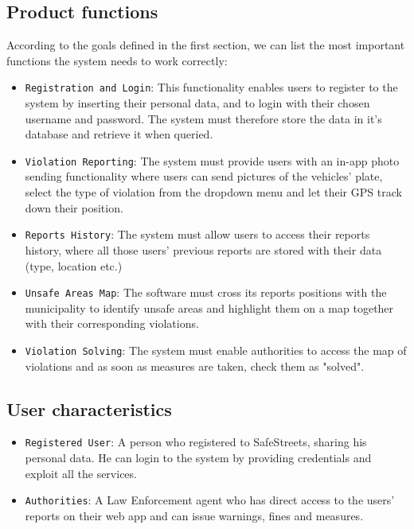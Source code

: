 \documentclass[12pt,a4paper]{article}
\begin{document}
\subsection{Product functions} 
According to the goals defined in the first section, we can list the most important functions the system needs to work correctly:
\begin{itemize}
\item {\texttt{Registration and Login}}: This functionality enables users to register to the system by inserting their personal data, and to login with their chosen username and password. The system must therefore store the data in it's database and retrieve it when queried.  
\item {\texttt{Violation Reporting}}: The system must provide users with an in-app photo sending functionality where users can send pictures of the vehicles' plate, select the type of violation from the dropdown menu and let their GPS track down their position.
\item {\texttt{Reports History}}: The system must allow users to access their reports history, where all those users' previous reports are stored with their data (type, location etc.)
\item {\texttt{Unsafe Areas Map}}: The software must cross its reports positions with the municipality to identify unsafe areas and highlight them on a map together with their corresponding violations.
\item {\texttt{Violation Solving}}: The system must enable authorities to access the map of violations and as soon as measures are taken, check them as "solved".
\end{itemize}

\newpage

\subsection{User characteristics} 
\begin{itemize}
\item {\texttt{Registered User}}: A person who registered to SafeStreets, sharing his personal data. He can login to the system by providing credentials and exploit all the services.
\item {\texttt{Authorities}}: A Law Enforcement agent who has direct access to the users' reports on their web app and can issue warnings, fines and measures.
\end{itemize}
\end{document}
